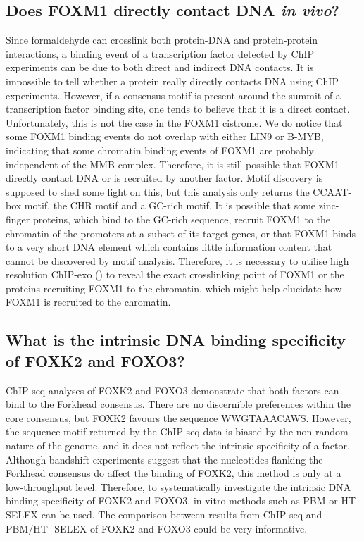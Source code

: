\subsection{Does FOXM1 directly contact DNA \textit{in vivo}?}

Since formaldehyde can crosslink both protein-DNA and protein-protein interactions, a binding event of a transcription factor detected by ChIP experiments can be due to both direct and indirect DNA contacts. It is impossible to tell whether a protein really directly contacts DNA using ChIP experiments. However, if a consensus motif is present around the summit of a transcription factor binding site, one tends to believe that it is a direct contact. Unfortunately, this is not the case in the FOXM1 cistrome. We do notice that some FOXM1 binding events do not overlap with either LIN9 or B-MYB, indicating that some chromatin binding events of FOXM1 are probably independent of the MMB complex. Therefore, it is still possible that FOXM1 directly contact DNA or is recruited by another factor. Motif discovery is supposed to shed some light on this, but this analysis only returns the CCAAT-box motif, the CHR motif and a GC-rich motif. It is possible that some zinc-finger proteins, which bind to the GC-rich sequence, recruit FOXM1 to the chromatin of the promoters at a subset of its target genes, or that FOXM1 binds to a very short DNA element which contains little information content that cannot be discovered by motif analysis. Therefore, it is necessary to utilise high resolution ChIP-exo (\cite{rhee2011comprehensive}) to reveal the exact crosslinking point of FOXM1 or the proteins recruiting FOXM1 to the chromatin, which might help elucidate how FOXM1 is recruited to the chromatin.

\subsection{What is the intrinsic DNA binding specificity of FOXK2 and FOXO3?}

ChIP-seq analyses of FOXK2 and FOXO3 demonstrate that both factors can bind to the Forkhead consensus. There are no discernible preferences within the core consensus, but FOXK2 favours the sequence WWGTAAACAWS. However, the sequence motif returned by the ChIP-seq data is biased by the non-random nature of the genome, and it does not reflect the intrinsic specificity of a factor. Although bandshift experiments suggest that the nucleotides flanking the Forkhead consensus do affect the binding of FOXK2, this method is only at a low-throughput level. Therefore, to systematically investigate the intrinsic DNA binding specificity of FOXK2 and FOXO3, in vitro methods such as PBM or HT- SELEX can be used. The comparison between results from ChIP-seq and PBM/HT- SELEX of FOXK2 and FOXO3 could be very informative.


